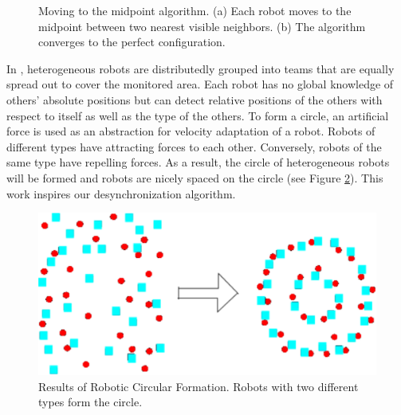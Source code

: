\begin{figure}[!t]
\centerline {
	\hfil
}
\caption{Moving to the midpoint algorithm. (a) Each robot moves to the midpoint between two nearest visible neighbors. (b) The algorithm converges to the perfect configuration.}
\label{fig:robotic-closed-ring-desync}
\lofcont
\end{figure}

In \cite{4141997}, heterogeneous robots are distributedly grouped into teams that are equally spread out to cover the monitored area. Each robot has no global knowledge of others’ absolute positions but can detect relative positions of the others with respect to itself as well as the type of the others. 
To form a circle, an artificial force is used as an abstraction for velocity adaptation of a robot. 
Robots of different types have attracting forces to each other. Conversely, robots of the same type have repelling forces. As a result, the circle of heterogeneous robots will be formed and robots are nicely spaced on the circle  (see Figure \ref{fig:circular_formation}). This work inspires our desynchronization algorithm.

\begin{figure}[!t]
\centering
\includegraphics[width=5.0in]{figure/robo_new}
\caption{Results of Robotic Circular Formation. Robots with two different types form the circle.}
\label{fig:circular_formation}
\end{figure}

